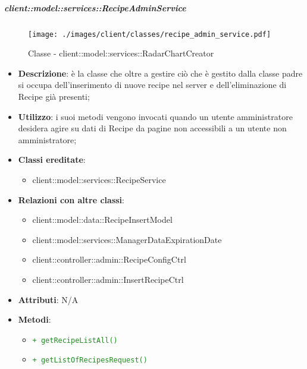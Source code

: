 		\subparagraph{client::model::services::RecipeAdminService} %
		\label{subp:client_model_services_recipeadminservice}
		\begin{figure}[htbp]
				\centering
				\centerline{\texttt{[image: ./images/client/classes/recipe\_admin\_service.pdf]}}
				\caption{Classe - client::model::services::RadarChartCreator}
			\end{figure}
			\begin{itemize}
				\item \textbf{Descrizione}: è la classe che oltre a gestire ciò che è gestito dalla classe padre si occupa dell'inserimento di nuove recipe nel server e dell'eliminazione di Recipe già presenti;
				\item \textbf{Utilizzo}: i suoi metodi vengono invocati quando un utente amministratore desidera agire su dati di Recipe da pagine non accessibili a un utente non amministratore;
				\item \textbf{Classi ereditate}:
					\begin{itemize}
						\item client::model::services::RecipeService
					\end{itemize}
				\item \textbf{Relazioni con altre classi}:
					\begin{itemize}
						\item client::model::data::RecipeInsertModel
						\item client::model::services::ManagerDataExpirationDate
						\item client::controller::admin::RecipeConfigCtrl
						\item client::controller::admin::InsertRecipeCtrl
					\end{itemize}
				\item \textbf{Attributi}: N/A
				\item \textbf{Metodi}:
				\begin{itemize}
					\item \textcolor{forestgreen}{\texttt{+ getRecipeListAll()}}
					\item \textcolor{forestgreen}{\texttt{+ getListOfRecipesRequest()}}
					\begin{description}

\end{description}
\end{itemize}
\end{itemize}
